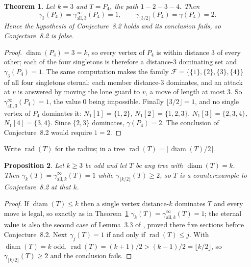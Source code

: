 \documentclass[11pt]{amsart}
\newtheorem{theorem}{Theorem}
\newtheorem{proposition}[theorem]{Proposition}
\begin{document}
\begin{theorem}\label{thm:main}
Let $k=3$ and $T=P_4$, the path $1-2-3-4$. Then
\[
 \gamma_3(P_4)=\gamma_{\mathrm{all},3}^{\infty}(P_4)=1,
 \qquad
 \gamma_{\lfloor 3/2\rfloor}(P_4)=\gamma(P_4)=2 .
\]
Hence the hypothesis of Conjecture~8.2 holds and its conclusion fails, so
Conjecture~8.2 is false.
\end{theorem}

\begin{proof}
$\operatorname{diam}(P_4)=3=k$, so every vertex of $P_4$ is within distance $3$
of every other; each of the four singletons is therefore a distance-$3$
dominating set and $\gamma_3(P_4)=1$. The same computation makes the family
$\mathcal F=\bigl\{\{1\},\{2\},\{3\},\{4\}\bigr\}$ of all four singletons
eternal: each member distance-$3$ dominates, and an attack at $v$ is answered by
moving the lone guard to $v$, a move of length at most $3$. So
$\gamma_{\mathrm{all},3}^{\infty}(P_4)=1$, the value $0$ being impossible.
Finally $\lfloor 3/2\rfloor=1$, and no single vertex of $P_4$ dominates it:
$N_1[1]=\{1,2\}$, $N_1[2]=\{1,2,3\}$, $N_1[3]=\{2,3,4\}$, $N_1[4]=\{3,4\}$.
Since $\{2,3\}$ dominates, $\gamma(P_4)=2$. The conclusion of Conjecture~8.2
would require $1=2$.
\end{proof}

Write $\operatorname{rad}(T)$ for the radius; in a tree
$\operatorname{rad}(T)=\lceil\operatorname{diam}(T)/2\rceil$.

\begin{proposition}\label{prop:oddk}
Let $k\ge3$ be odd and let $T$ be any tree with $\operatorname{diam}(T)=k$.
Then $\gamma_k(T)=\gamma_{\mathrm{all},k}^{\infty}(T)=1$ while
$\gamma_{\lfloor k/2\rfloor}(T)\ge2$, so $T$ is a counterexample to
Conjecture~8.2 at that $k$.
\end{proposition}

\begin{proof}
If $\operatorname{diam}(T)\le k$ then a single vertex distance-$k$ dominates
$T$ and every move is legal, so exactly as in Theorem~\ref{thm:main}
$\gamma_k(T)=\gamma_{\mathrm{all},k}^{\infty}(T)=1$; the eternal value is also
the second case of Lemma~3.3 of \cite{CvB}, proved there five sections before
Conjecture~8.2. Next $\gamma_j(T)=1$ if and only if $\operatorname{rad}(T)\le
j$. With $\operatorname{diam}(T)=k$ odd, $\operatorname{rad}(T)=(k+1)/2>
(k-1)/2=\lfloor k/2\rfloor$, so $\gamma_{\lfloor k/2\rfloor}(T)\ge2$ and the
conclusion fails.
\end{proof}
\end{document}
